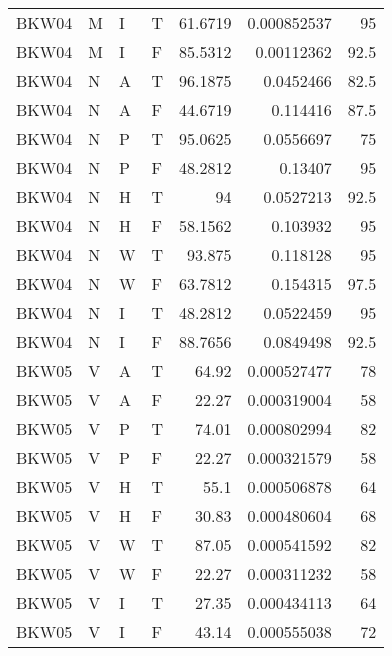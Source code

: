\begin{longtable}{llllrrr}
    BKW04    & M     & I     & T          & 61.6719    & 0.000852537 & 95       \\
    BKW04    & M     & I     & F          & 85.5312    & 0.00112362  & 92.5     \\
    BKW04    & N     & A     & T          & 96.1875    & 0.0452466   & 82.5     \\
    BKW04    & N     & A     & F          & 44.6719    & 0.114416    & 87.5     \\
    BKW04    & N     & P     & T          & 95.0625    & 0.0556697   & 75       \\
    BKW04    & N     & P     & F          & 48.2812    & 0.13407     & 95       \\
    BKW04    & N     & H     & T          & 94         & 0.0527213   & 92.5     \\
    BKW04    & N     & H     & F          & 58.1562    & 0.103932    & 95       \\
    BKW04    & N     & W     & T          & 93.875     & 0.118128    & 95       \\
    BKW04    & N     & W     & F          & 63.7812    & 0.154315    & 97.5     \\
    BKW04    & N     & I     & T          & 48.2812    & 0.0522459   & 95       \\
    BKW04    & N     & I     & F          & 88.7656    & 0.0849498   & 92.5     \\
    BKW05    & V     & A     & T          & 64.92      & 0.000527477 & 78       \\
    BKW05    & V     & A     & F          & 22.27      & 0.000319004 & 58       \\
    BKW05    & V     & P     & T          & 74.01      & 0.000802994 & 82       \\
    BKW05    & V     & P     & F          & 22.27      & 0.000321579 & 58       \\
    BKW05    & V     & H     & T          & 55.1       & 0.000506878 & 64       \\
    BKW05    & V     & H     & F          & 30.83      & 0.000480604 & 68       \\
    BKW05    & V     & W     & T          & 87.05      & 0.000541592 & 82       \\
    BKW05    & V     & W     & F          & 22.27      & 0.000311232 & 58       \\
    BKW05    & V     & I     & T          & 27.35      & 0.000434113 & 64       \\
    BKW05    & V     & I     & F          & 43.14      & 0.000555038 & 72       \\

\end{longtable}
